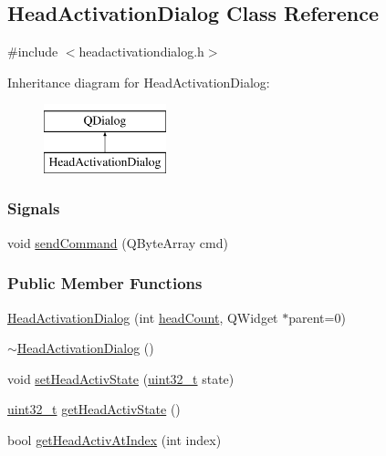 \hypertarget{classHeadActivationDialog}{}\subsection{Head\+Activation\+Dialog Class Reference}
\label{classHeadActivationDialog}


{\ttfamily \#include $<$headactivationdialog.\+h$>$}

Inheritance diagram for Head\+Activation\+Dialog\+:\begin{figure}[H]
\begin{center}
\leavevmode
\includegraphics[height=2.000000cm]{classHeadActivationDialog}
\end{center}
\end{figure}
\subsubsection*{Signals}
\begin{DoxyCompactItemize}
\item 
void \mbox{\hyperlink{classHeadActivationDialog_ae76f8ea5faecab0d161904b14d925bda}{send\+Command}} (Q\+Byte\+Array cmd)
\end{DoxyCompactItemize}
\subsubsection*{Public Member Functions}
\begin{DoxyCompactItemize}
\item 
\mbox{\hyperlink{classHeadActivationDialog_aa8af7af33f3feac8547580e4c9bac577}{Head\+Activation\+Dialog}} (int \mbox{\hyperlink{classHeadActivationDialog_a0403b31877ebf58f738b9bfa68d31434}{head\+Count}}, Q\+Widget $\ast$parent=0)
\item 
\mbox{\hyperlink{classHeadActivationDialog_a277a05013a9304f1fc07ea89576e7b3d}{$\sim$\+Head\+Activation\+Dialog}} ()
\item 
void \mbox{\hyperlink{classHeadActivationDialog_a471339dee05798a94de85a2ee2cd43c4}{set\+Head\+Activ\+State}} (\mbox{\hyperlink{settings_8h_a4196118492a3b1493c81f250e90af775}{uint32\+\_\+t}} state)
\item 
\mbox{\hyperlink{settings_8h_a4196118492a3b1493c81f250e90af775}{uint32\+\_\+t}} \mbox{\hyperlink{classHeadActivationDialog_aa96f7a5383ade62d5bdf21fd2defac75}{get\+Head\+Activ\+State}} ()
\item 
bool \mbox{\hyperlink{classHeadActivationDialog_a1a6004ae7f92565dbf3bc42ff2f8cf5c}{get\+Head\+Activ\+At\+Index}} (int index)
\end{DoxyCompactItemize}
